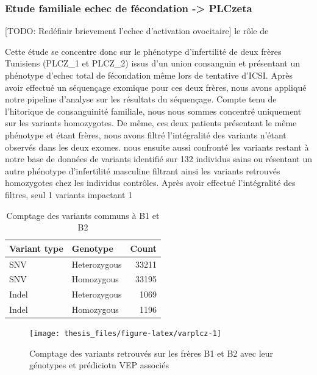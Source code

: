 \documentclass[12pt,twoside]{reedthesis}
\theoremstyle{definition}
\theoremstyle{definition}
\theoremstyle{remark}
\begin{document}
  \newpage  
  
  \hypertarget{plcz}{\subsubsection{Etude familiale echec de fécondation
  -\textgreater{} PLCzeta}\label{plcz}}
  
  {[}TODO: Redéfinir brievement l'echec d'activation ovocitaire{]} le rôle
  de
  
  Cette étude se concentre donc sur le phénotype d'infertilité de deux
  frères Tunisiens (PLCZ\_1 et PLCZ\_2) issus d'un union consanguin et
  présentant un phénotype d'echec total de fécondation même lors de
  tentative d'ICSI. Après avoir effectué un séquençage exomique pour ces
  deux frères, nous avons appliqué notre pipeline d'analyse sur les
  résultats du séquençage. Compte tenu de l'hitorique de consanguinité
  familiale, nous nous sommes concentré uniquement sur les variants
  homozygotes. De même, ces deux patients présentant le même phénotype et
  étant frères, nous avons filtré l'intégralité des variants n'étant
  observés dans les deux exomes. nous ensuite aussi confronté les variants
  restant à notre base de données de variants identifié sur 132 individus
  sains ou résentant un autre phénotype d'infertilité masculine filtrant
  ainsi les variants retrouvés homozygotes chez les individus contrôles.
  Après avoir effectué l'intégralité des filtres, seul 1 variants
  impactant 1
  
  \begin{table}
  
  \caption{\label{tab:plczetatabcommonvar}Comptage des variants communs à B1 et B2}
  \centering
  \begin{tabular}[t]{l|l|r}
  \hline
  Variant type & Genotype & Count\\
  \hline
  SNV & Heterozygous & 33211\\
  \hline
  SNV & Homozygous & 33195\\
  \hline
  Indel & Heterozygous & 1069\\
  \hline
  Indel & Homozygous & 1196\\
  \hline
  \end{tabular}
  \end{table}
  
  \begin{figure}
  
  {\centering \texttt{[image: thesis\_files/figure-latex/varplcz-1]} 
  
  }
  
  \caption[Comptage des variants retrouvés sur les frères B1 et B2 avec leur génotypes et prédiciotn VEP associés]{Comptage des variants retrouvés sur les frères B1 et B2 avec leur génotypes et prédiciotn VEP associés}\label{fig:varplcz}
  \end{figure}
  
\end{document}
